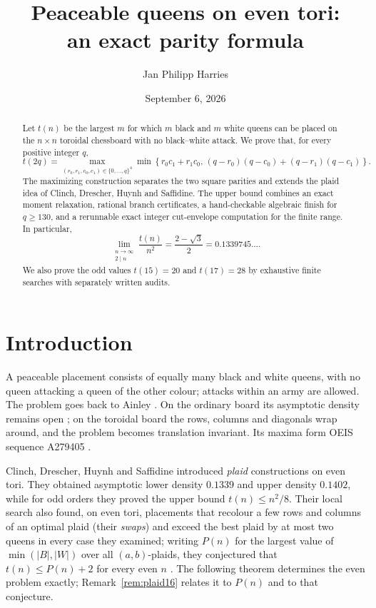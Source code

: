 \documentclass[11pt]{amsart}
\title[Peaceable queens on even tori]{Peaceable queens on even tori:\\an exact parity formula}
\author{Jan Philipp Harries}
\date{September 6, 2026}
\theoremstyle{definition}
\theoremstyle{remark}
\begin{document}
\begin{abstract}
Let $t(n)$ be the largest $m$ for which $m$ black and $m$ white queens can be placed on the $n\times n$ toroidal chessboard with no black--white attack. We prove that, for every positive integer $q$,
\[
t(2q)=
\max_{(r_0,r_1,c_0,c_1)\in\{0,\ldots,q\}^4}
\min\!\left\{r_0c_1+r_1c_0,\,
(q-r_0)(q-c_0)+(q-r_1)(q-c_1)\right\}.
\]
The maximizing construction separates the two square parities and extends the
plaid idea of Clinch, Drescher, Huynh and Saffidine.  The upper bound combines
an exact moment relaxation, rational branch certificates, a hand-checkable
algebraic finish for $q\ge130$, and a rerunnable exact integer cut-envelope
computation for the finite range.  In particular,
\[
\lim_{\substack{n\to\infty\\2\mid n}}\frac{t(n)}{n^2}
=\frac{2-\sqrt3}{2}=0.1339745\ldots .
\]
We also prove the odd values $t(15)=20$ and $t(17)=28$ by exhaustive finite
searches with separately written audits.
\end{abstract}

\maketitle

\section{Introduction}\label{sec:intro}

A peaceable placement consists of equally many black and white queens, with no
queen attacking a queen of the other colour; attacks within an army are
allowed.  The problem goes back to Ainley \cite{Ainley77}.  On the ordinary
board its asymptotic density remains open \cite{CDHS25}; on the toroidal board
the rows, columns and diagonals wrap around, and the problem becomes
translation invariant.  Its maxima form OEIS sequence A279405
\cite{OEIS279405}.

Clinch, Drescher, Huynh and Saffidine \cite{CDHS25,CDHS24} introduced
\emph{plaid} constructions on even tori.  They obtained asymptotic lower
density $0.1339$ and upper density $0.1402$, while for odd orders they proved
the upper bound $t(n)\le n^2/8$.  Their local search also found, on even
tori, placements that recolour a few rows and columns of an optimal plaid
(their \emph{swaps}) and exceed the best plaid by at most two queens in every
case they examined; writing $P(n)$ for the largest value of $\min(|B|,|W|)$
over all $(a,b)$-plaids, they conjectured that $t(n)\le P(n)+2$ for every
even $n$ \cite[Conjecture~5.1]{CDHS24}.  The following theorem determines the
even problem exactly; Remark~\ref{rem:plaid16} relates it to $P(n)$ and to
that conjecture.
\end{document}
